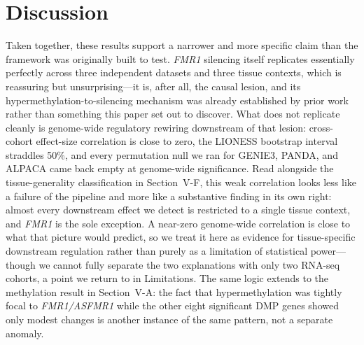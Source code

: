 \documentclass[journal]{IEEEtran}
\newcommand{\gene}[1]{\textit{#1}}
\begin{document}
\section{Discussion}
Taken together, these results support a narrower and more specific claim than the framework was originally built to test. \gene{FMR1} silencing itself replicates essentially perfectly across three independent datasets and three tissue contexts, which is reassuring but unsurprising---it is, after all, the causal lesion, and its hypermethylation-to-silencing mechanism was already established by prior work~\cite{peprah2012,hayward2021,liu2018,brykczynska2016} rather than something this paper set out to discover. What does not replicate cleanly is genome-wide regulatory rewiring downstream of that lesion: cross-cohort effect-size correlation is close to zero, the LIONESS bootstrap interval straddles 50\%, and every permutation null we ran for GENIE3, PANDA, and ALPACA came back empty at genome-wide significance. Read alongside the tissue-generality classification in Section~V-F, this weak correlation looks less like a failure of the pipeline and more like a substantive finding in its own right: almost every downstream effect we detect is restricted to a single tissue context, and \gene{FMR1} is the sole exception. A near-zero genome-wide correlation is close to what that picture would predict, so we treat it here as evidence for tissue-specific downstream regulation rather than purely as a limitation of statistical power---though we cannot fully separate the two explanations with only two RNA-seq cohorts, a point we return to in Limitations. The same logic extends to the methylation result in Section~V-A: the fact that hypermethylation was tightly focal to \gene{FMR1/ASFMR1} while the other eight significant DMP genes showed only modest changes is another instance of the same pattern, not a separate anomaly.
\end{document}
